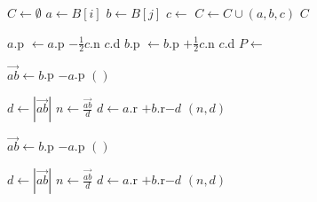 \documentclass{article}
\begin{document}
\newpage

\begin{algorithmic}
        \State $C \gets \emptyset$
            \State $a \gets B[i]$
                \State $b \gets B[j]$
                \State $c \gets$ 
                    \State $C \gets C \cup (a, b, c)$
                \EndIf
            \EndFor
        \EndFor
        \State \Return $C$
    \EndFunction
\end{algorithmic}

\begin{algorithmic}
            \State $a$.p $\gets a$.p $- \frac{1}{2}c.$n $c$.d
            \State $b$.p $\gets b$.p $+ \frac{1}{2}c.$n $c$.d
            \State $P \gets$ 
            \State {}
        \EndFor
    \EndFunction
\end{algorithmic}

\newpage

\begin{algorithmic}
        \State $\vec{ab} \gets b$.p $- a$.p
            \State \Return $()$
        \EndIf

        \State $d \gets |\vec{ab}|$
        \State $n \gets \frac{\vec{ab}}{d}$
        \State $d \gets a$.r $+ b$.r$ - d$
        \State \Return $(n, d)$
    \EndFunction
\end{algorithmic}

\newpage

\begin{algorithmic}
        \State $\vec{ab} \gets b$.p $- a$.p
            \State \Return $()$
        \EndIf

        \State $d \gets |\vec{ab}|$
        \State $n \gets \frac{\vec{ab}}{d}$
        \State $d \gets a$.r $+ b$.r$ - d$
        \State \Return $(n, d)$
    \EndFunction
\end{algorithmic}

\newpage
\end{document}
